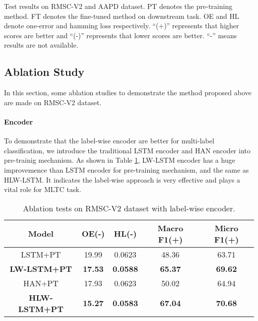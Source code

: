 \documentclass[runningheads]{llncs}
\begin{document}
\begin{table}[htb]
    \caption{Test results on RMSC-V2 and AAPD dataset. PT denotes the pre-training method. FT denotes the fine-tuned method on downstream task. OE and HL denote one-error and hamming loss respectively. ``(+)'' represents that higher scores are better and ``(-)'' represents that lower scores are better. ``-'' means results are not available.}
    \label{tab:results}
\end{table}

\subsection{Ablation Study}
In this section, some ablation studies to demonstrate the method proposed above are made on RMSC-V2 dataset. 

\paragraph{Encoder} To demonstrate that the label-wise encoder are better for multi-label classification, we introduce the traditional LSTM encoder and HAN encoder into pre-trainig mechanism. As shown in Table \ref{tab:lw-encoder}, LW-LSTM encoder has a huge improvemence than LSTM encoder for pre-training mechanism, and the same as HLW-LSTM. It indicates the label-wise approach is very effective and plays a vital role for MLTC task.
\begin{table}[htb]
    \centering
    \setlength{\abovecaptionskip}{0.3cm}
    \begin{tabular}{c|cccc}
        \hline
        \textbf{Model} & \textbf{OE(-)} & \textbf{HL(-)} & \textbf{Macro F1(+)} & \textbf{Micro F1(+)} \\ \hline
        LSTM+PT & 19.99 & 0.0623 & 48.36 & 63.71 \\
        \textbf{LW-LSTM+PT} & \textbf{17.53} & \textbf{0.0588} & \textbf{65.37} & \textbf{69.62} \\
        HAN+PT & 17.93 & 0.0623 & 50.02 & 64.94 \\
        \textbf{HLW-LSTM+PT} & \textbf{15.27} & \textbf{0.0583} & \textbf{67.04} & \textbf{70.68} \\
        \hline
    \end{tabular}
    \caption{Ablation tests on RMSC-V2 dataset with label-wise encoder.}
    \label{tab:lw-encoder}
\end{table}
\end{document}
